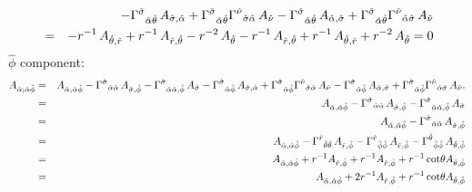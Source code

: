 \documentclass[\mydriver,12pt,twoside,notitlepage,a4paper]{article}
\begin{document}
\begin{eqnarray}
&&-{\Gamma^{\hat\sigma}}_{\hat\alpha\hat\theta}\,A_{\hat\sigma,\hat\alpha}
+{\Gamma^{\hat\sigma}}_{\hat\alpha\hat\theta}{\Gamma^{\hat\nu}}_{\hat\sigma\hat\alpha}\,A_{\hat\nu}
-{\Gamma^{\hat\sigma}}_{\hat\alpha\hat\theta}\,A_{\hat\alpha,\hat\sigma}
+{\Gamma^{\hat\sigma}}_{\hat\alpha\hat\theta}{\Gamma^{\hat\nu}}_{\hat\alpha\hat\sigma}\,A_{\hat\nu}
\cr
&=&
-r^{-1}\,A_{\hat\theta,\hat r}
+r^{-1}\,A_{\hat r,\hat\theta}
-r^{-2}\,A_{\hat\theta}
-r^{-1}\,A_{\hat r,\hat\theta}
+r^{-1}\,A_{\hat\theta,\hat r}
+r^{-2}\,A_{\hat\theta}
=0
\end{eqnarray}
$\hat\phi$ component:
\begin{eqnarray}
A_{\hat\alpha;\hat\alpha\hat\phi}
&=&A_{\hat\alpha,\hat\alpha\hat\phi}
-{\Gamma^{\hat\sigma}}_{\hat\alpha\hat\alpha}\,A_{\hat\sigma,\hat\phi}
-{\Gamma^{\hat\sigma}}_{\hat\alpha\hat\alpha,\hat\phi}\,A_{\hat\sigma}
-{\Gamma^{\hat\sigma}}_{\hat\alpha\hat\phi}\,A_{\hat\sigma,\hat\alpha}
+{\Gamma^{\hat\sigma}}_{\hat\alpha\hat\phi}{\Gamma^{\hat\nu}}_{\hat\sigma\hat\alpha}\,A_{\hat\nu}
-{\Gamma^{\hat\sigma}}_{\hat\alpha\hat\phi}\,A_{\hat\alpha,\hat\sigma}
+{\Gamma^{\hat\sigma}}_{\hat\alpha\hat\phi}{\Gamma^{\hat\nu}}_{\hat\alpha\hat\sigma}\,A_{\hat\nu}.
\cr
&=&A_{\hat\alpha,\hat\alpha\hat\phi}
-{\Gamma^{\hat\sigma}}_{\hat\alpha\hat\alpha}\,A_{\hat\sigma,\hat\phi}
-{\Gamma^{\hat\sigma}}_{\hat\alpha\hat\alpha,\hat\phi}\,A_{\hat\sigma}
\cr
&=&A_{\hat\alpha,\hat\alpha\hat\phi}
-{\Gamma^{\hat\sigma}}_{\hat\alpha\hat\alpha}\,A_{\hat\sigma,\hat\phi}
\cr
&=&A_{\hat\alpha,\hat\alpha\hat\phi}
-{\Gamma^{\hat r}}_{\hat\theta\hat\theta}\,A_{\hat r,\hat\phi}
-{\Gamma^{\hat r}}_{\hat\phi\hat\phi}\,A_{\hat r,\hat\phi}
-{\Gamma^{\hat\theta}}_{\hat\phi\hat\phi}\,A_{\hat\theta,\hat\phi}
\cr
&=&A_{\hat\alpha,\hat\alpha\hat\phi}
+r^{-1}A_{\hat r,\hat\phi}
+r^{-1}A_{\hat r,\hat\phi}
+r^{-1}\cot\!\theta A_{\hat\theta,\hat\phi}
\cr
&=&A_{\hat\alpha,\hat\alpha\hat\phi}
+2r^{-1}A_{\hat r,\hat\phi}
+r^{-1}\cot\!\theta A_{\hat\theta,\hat\phi}
\end{eqnarray}
\end{document}
